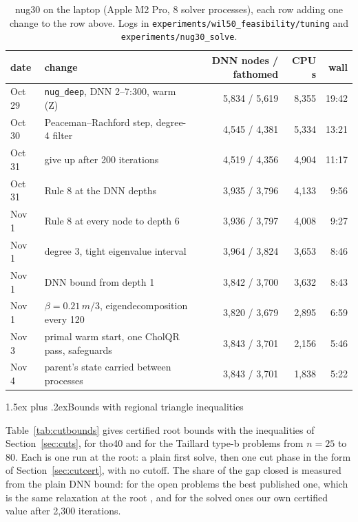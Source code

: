 \documentclass[10pt]{article}
\makeatletter
\renewcommand\subsection{\@startsection{subsection}{2}{\z@}{-3.25ex plus -1ex minus -.2ex}%
  {1.5ex plus .2ex}{\normalfont\normalsize\bfseries}}
\theoremstyle{remark}
\makeatother
\begin{document}
\begin{table}[t]\centering
\caption{nug30 on the laptop (Apple M2 Pro, 8 solver processes), each row adding one
change to the row above. Logs in \texttt{experiments/wil50\_feasibility/tuning} and
\texttt{experiments/nug30\_solve}.}\label{tab:record}
\small\setlength{\tabcolsep}{4pt}
\begin{tabular}{l>{\raggedright\arraybackslash}p{5.4cm}rrr}
\toprule
date & change & DNN nodes / fathomed & CPU s & wall\\
\midrule
Oct 29 & \texttt{nug\_deep}, DNN 2--7:300, warm (Z) & 5,834 / 5,619 & 8,355 & 19:42\\
Oct 30 & Peaceman--Rachford step, degree-4 filter & 4,545 / 4,381 & 5,334 & 13:21\\
Oct 31 & give up after 200 iterations & 4,519 / 4,356 & 4,904 & 11:17\\
Oct 31 & Rule 8 at the DNN depths & 3,935 / 3,796 & 4,133 & 9:56\\
Nov 1 & Rule 8 at every node to depth 6 & 3,936 / 3,797 & 4,008 & 9:27\\
Nov 1 & degree 3, tight eigenvalue interval & 3,964 / 3,824 & 3,653 & 8:46\\
Nov 1 & DNN bound from depth 1 & 3,842 / 3,700 & 3,632 & 8:43\\
Nov 1 & $\beta = 0.21\,m/3$, eigendecomposition every 120 & 3,820 / 3,679 & 2,895 & 6:59\\
Nov 3 & primal warm start, one CholQR pass, safeguards & 3,843 / 3,701 & 2,156 & 5:46\\
Nov 4 & parent's state carried between processes & 3,843 / 3,701 & 1,838 & 5:22\\
\bottomrule
\end{tabular}
\end{table}

\subsection{Bounds with regional triangle inequalities}\label{sec:cutbounds}

Table~\ref{tab:cutbounds} gives certified root bounds with the inequalities of
Section~\ref{sec:cuts}, for tho40 and for the Taillard type-b problems from $n=25$
to 80. Each is one run at the root: a plain first solve, then one cut phase in the
form of Section~\ref{sec:cutcert}, with no cutoff. The share of the gap closed is
measured from the plain DNN bound: for the open problems the best published one,
which is the same relaxation at the root \cite{graham,kkt}, and for the solved ones
our own certified value after 2,300 iterations.
\end{document}
